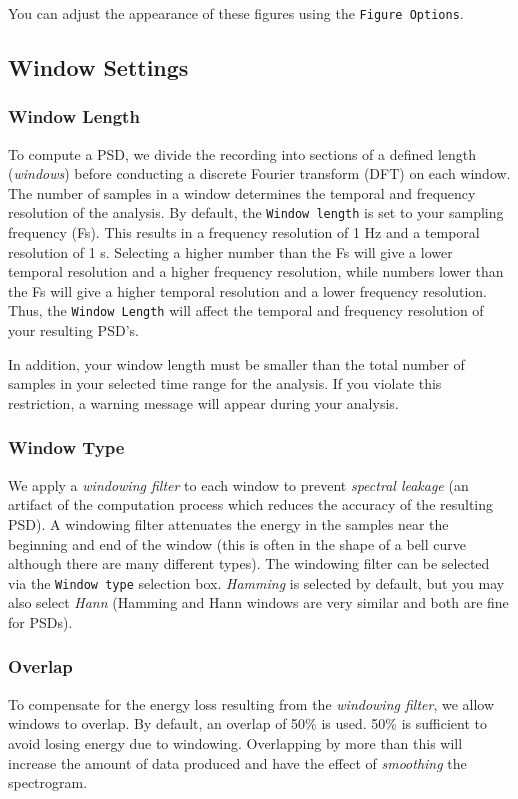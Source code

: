 \documentclass[11pt]{report}
\begin{document}
You can adjust the appearance of these figures using the \texttt{Figure Options}.

\subsection{Window Settings}
\subsubsection{Window Length}
To compute a PSD, we divide the recording into sections of a defined length (\textit{windows}) before conducting a discrete Fourier transform (DFT) on each window. The number of samples in a window determines the temporal and frequency resolution of the analysis. By default, the \texttt{Window length} is set to your sampling frequency (Fs).  This results in a frequency resolution of 1 Hz and a temporal resolution of 1 s. Selecting a higher number than the Fs will give a lower temporal resolution and a higher frequency resolution, while numbers lower than the Fs will give a higher temporal resolution and a lower frequency resolution. Thus, the \texttt{Window Length} will affect the temporal and frequency resolution of your resulting PSD's.

In addition, your window length must be smaller than the total number of samples in your selected time range for the analysis. If you violate this restriction, a warning message will appear during your analysis.

\subsubsection{Window Type}
We apply a \textit{windowing filter} to each window to prevent \textit{spectral leakage} (an artifact of the computation process which reduces the accuracy of the resulting PSD).  A windowing filter attenuates the energy in the samples near the beginning and end of the window (this is often in the shape of a bell curve although there are many different types).   The windowing filter can be selected via the \texttt{Window type} selection box.  \textit{Hamming} is selected by default, but you may also select \textit{Hann} (Hamming and Hann windows are very similar and both are fine for PSDs).

\subsubsection{Overlap}

To compensate for the energy loss resulting from the \textit{windowing filter}, we allow windows to overlap.
By default, an overlap of 50\% is used. 50\% is sufficient to avoid losing energy due to windowing.  Overlapping by more than this will increase the amount of data produced and have the effect of \textit{smoothing} the spectrogram.
\end{document}
